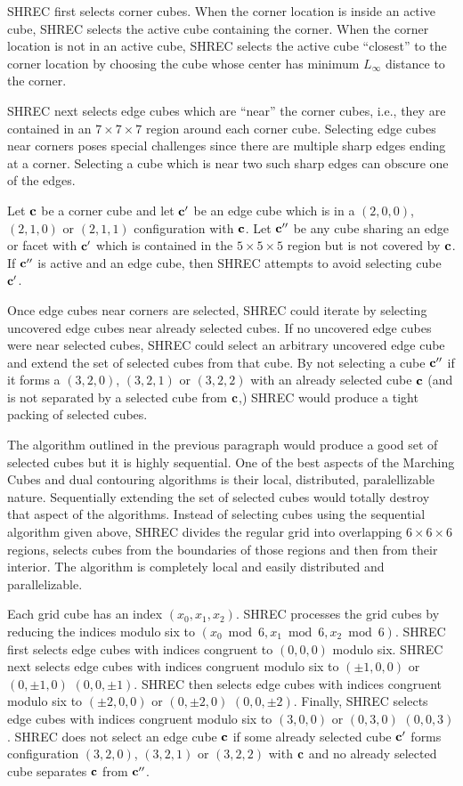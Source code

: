 SHREC first selects corner cubes.
When the corner location is inside an active cube,
SHREC selects the active cube containing the corner.
When the corner location is not in an active cube,
SHREC selects the active cube ``closest'' to the corner location
by choosing the cube whose center has minimum $L_\infty$ distance
to the corner.

SHREC next selects edge cubes which are ``near'' the corner cubes,
i.e., they are contained in an $7 \times 7 \times 7$ region
around each corner cube.
Selecting edge cubes near corners poses special challenges
since there are multiple sharp edges ending at a corner.
Selecting a cube which is near two such sharp edges
can obscure one of the edges.

Let $\mathbf{c}$ be a corner cube and let $\mathbf{c}'$ be an edge cube
which is in a $(2,0,0)$, $(2,1,0)$ or $(2,1,1)$ configuration with $\mathbf{c}$.
Let $\mathbf{c}''$ be any cube sharing an edge or facet with $\mathbf{c}'$
which is contained in the $5 \times 5 \times 5$ region
but is not covered by $\mathbf{c}$.
If $\mathbf{c}''$ is active and an edge cube,
then SHREC attempts to avoid selecting cube $\mathbf{c}'$.

Once edge cubes near corners are selected,
SHREC could iterate by selecting uncovered edge cubes 
near already selected cubes.
If no uncovered edge cubes were near selected cubes,
SHREC could select an arbitrary uncovered edge cube
and extend the set of selected cubes from that cube.
By not selecting a cube $\mathbf{c}''$ 
if it forms a $(3,2,0)$, $(3,2,1)$ or $(3,2,2)$
with an already selected cube $\mathbf{c}$ 
(and is not separated by a selected cube from $\mathbf{c}$,)
SHREC would produce a tight packing of selected cubes.

The algorithm outlined in the previous paragraph would produce
a good set of selected cubes but it is highly sequential.
One of the best aspects of the Marching Cubes and dual contouring algorithms
is their local, distributed, paralellizable nature.
Sequentially extending the set of selected cubes would totally destroy
that aspect of the algorithms.
Instead of selecting cubes using the sequential algorithm given above,
SHREC divides the regular grid 
into overlapping $6 \times 6 \times 6$ regions,
selects cubes from the boundaries of those regions and then from their interior.
The algorithm is completely local and easily distributed and parallelizable.

Each grid cube has an index $(x_0, x_1, x_2)$.
SHREC processes the grid cubes by reducing the indices modulo six
to $(x_0 \bmod 6, x_1 \bmod 6, x_2 \bmod 6)$.
SHREC first selects edge cubes with indices congruent to $(0,0,0)$ modulo six.
SHREC next selects edge cubes with indices congruent modulo six
to $(\pm 1,0,0)$ or $(0, \pm 1, 0)$ $(0, 0, \pm 1)$.
SHREC then selects edge cubes with indices congruent modulo six
to $(\pm 2,0,0)$ or $(0, \pm 2, 0)$ $(0, 0, \pm 2)$.
Finally, SHREC selects edge cubes with indices congruent modulo six
to $(3,0,0)$ or $(0, 3, 0)$ $(0, 0, 3)$.
SHREC does not select an edge cube $\mathbf{c}$ if some already selected cube $\mathbf{c}'$
forms configuration $(3,2,0)$, $(3,2,1)$ or $(3,2,2)$ with $\mathbf{c}$
and no already selected cube separates $\mathbf{c}$ from $\mathbf{c}''$.

